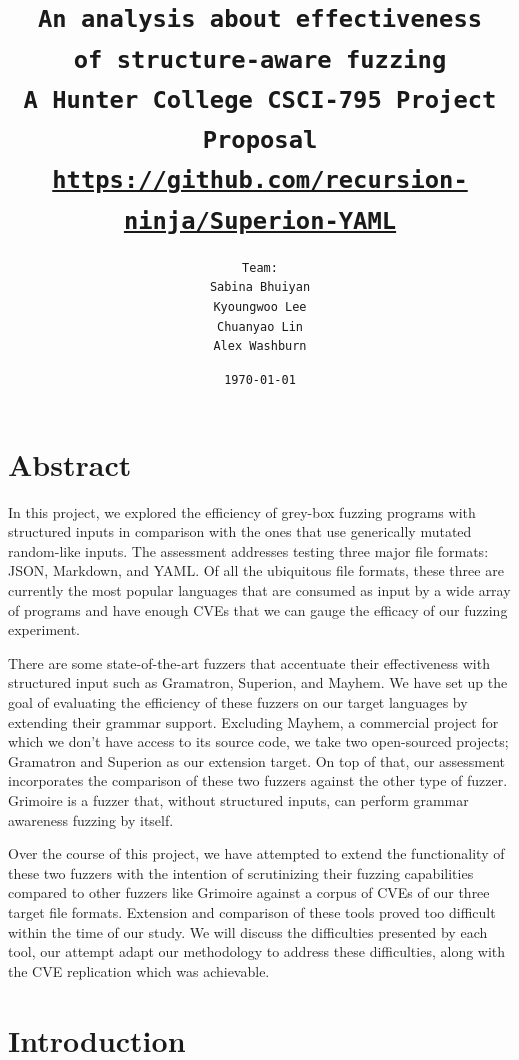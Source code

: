 \documentclass[12pt]{diazessay}
\title{\texttt{\huge{An analysis about effectiveness\\\vspace{-3mm}of structure-aware fuzzing} \\\vspace{-0.35cm} {\large A Hunter College CSCI-795 Project Proposal}\\\normalsize\url{https://github.com/recursion-ninja/Superion-YAML}}} %
\author{\texttt{{\Huge Team:}\\\vspace*{-0.5em} 
		Sabina Bhuiyan \\\vspace*{-0.5em} 
		Kyoungwoo Lee \\\vspace*{-0.5em}
		Chuanyao Lin \\\vspace*{-0.25em}
		Alex Washburn}} %
\date{\texttt{\today}} %
\begin{document}
\maketitle %

\vspace{1cm}
\section*{Abstract}


In this project, we explored the efficiency of grey-box fuzzing programs with structured inputs in comparison with the ones that use generically mutated random-like inputs.
The assessment addresses testing three major file formats: JSON, Markdown, and YAML.
Of all the ubiquitous file formats, these three are currently the most popular languages that are consumed as input by a wide array of programs and have enough CVEs that we can gauge the efficacy of our fuzzing experiment.

There are some state-of-the-art fuzzers that accentuate their effectiveness with structured input such as Gramatron, Superion, and Mayhem.
We have set up the goal of evaluating the efficiency of these fuzzers on our target languages by extending their grammar support.
Excluding Mayhem, a commercial project for which we don't have access to its source code, we take two open-sourced projects; Gramatron and Superion as our extension target.
On top of that, our assessment incorporates the comparison of these two fuzzers against the other type of fuzzer.
Grimoire is a fuzzer that, without structured inputs, can perform grammar awareness fuzzing by itself.

Over the course of this project, we have attempted to extend the functionality of these two fuzzers with the intention of scrutinizing their fuzzing capabilities compared to other fuzzers like Grimoire against a corpus of CVEs of our three target file formats.
Extension and comparison of these tools proved too difficult within the time of our study.
We will discuss the difficulties presented by each tool, our attempt adapt our methodology to address these difficulties, along with the CVE replication which was achievable.

\section*{Introduction}
\end{document}
